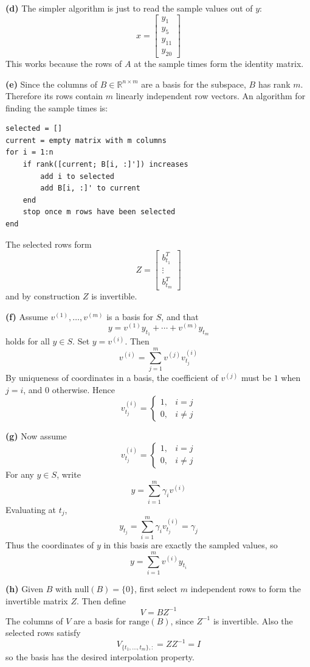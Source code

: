 \textbf{(d)}
The simpler algorithm is just to read the sample values out of \(y\):
\[
x=
\begin{bmatrix}
y_1\\y_5\\y_{11}\\y_{20}
\end{bmatrix}
\]
This works because the rows of \(A\) at the sample times form the identity matrix.

\textbf{(e)}
Since the columns of \(B\in\mathbb{R}^{n\times m}\) are a basis for the subspace, \(B\) has rank \(m\). Therefore its rows contain \(m\) linearly independent row vectors. An algorithm for finding the sample times is:

\begin{lstlisting}[language={}]
selected = []
current = empty matrix with m columns
for i = 1:n
    if rank([current; B[i, :]']) increases
        add i to selected
        add B[i, :]' to current
    end
    stop once m rows have been selected
end
\end{lstlisting}

The selected rows form
\[
Z=
\begin{bmatrix}
b_{t_1}^T\\
\vdots\\
b_{t_m}^T
\end{bmatrix}
\]
and by construction \(Z\) is invertible.

\textbf{(f)}
Assume \(v^{(1)},\ldots,v^{(m)}\) is a basis for \(S\), and that
\[
y=v^{(1)}y_{t_1}+\cdots+v^{(m)}y_{t_m}
\]
holds for all \(y\in S\). Set \(y=v^{(i)}\). Then
\[
v^{(i)}
=
\sum_{j=1}^m v^{(j)}v^{(i)}_{t_j}
\]
By uniqueness of coordinates in a basis, the coefficient of \(v^{(j)}\) must be \(1\) when \(j=i\), and \(0\) otherwise. Hence
\[
v^{(i)}_{t_j}
=
\begin{cases}
1,&i=j\\
0,&i\ne j
\end{cases}
\]

\textbf{(g)}
Now assume
\[
v^{(i)}_{t_j}
=
\begin{cases}
1,&i=j\\
0,&i\ne j
\end{cases}
\]
For any \(y\in S\), write
\[
y=\sum_{i=1}^m \gamma_i v^{(i)}
\]
Evaluating at \(t_j\),
\[
y_{t_j}
=
\sum_{i=1}^m \gamma_i v^{(i)}_{t_j}
=\gamma_j
\]
Thus the coordinates of \(y\) in this basis are exactly the sampled values, so
\[
y=\sum_{i=1}^m v^{(i)}y_{t_i}
\]

\textbf{(h)}
Given \(B\) with \(\mathrm{null}(B)=\{0\}\), first select \(m\) independent rows to form the invertible matrix \(Z\). Then define
\[
V=BZ^{-1}
\]
The columns of \(V\) are a basis for \(\mathrm{range}(B)\), since \(Z^{-1}\) is invertible. Also the selected rows satisfy
\[
V_{\{t_1,\ldots,t_m\},:}=ZZ^{-1}=I
\]
so the basis has the desired interpolation property.

